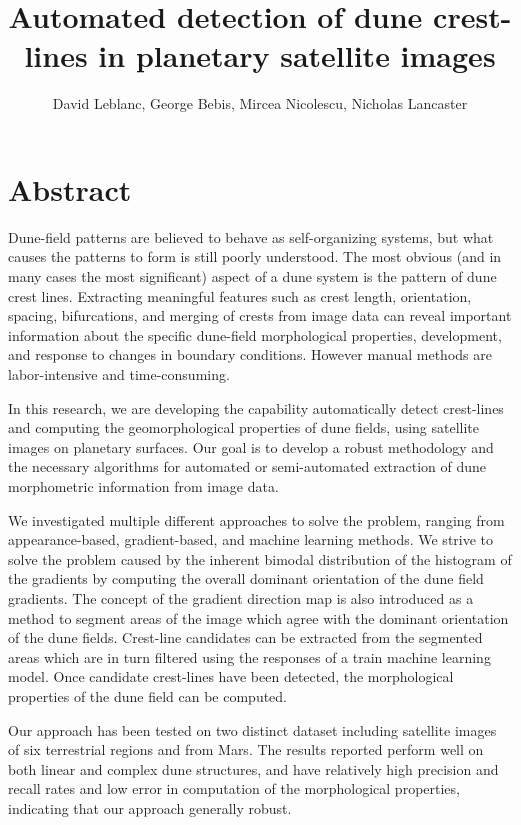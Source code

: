 \documentclass[11pt]{article}
\begin{document}
\title{Automated detection of dune crest-lines in planetary satellite images}
\author{David Leblanc, George Bebis, Mircea Nicolescu, Nicholas Lancaster}

\section*{Abstract}

Dune-field patterns are believed to behave as self-organizing systems, but what causes the patterns to form is still poorly understood. The most obvious (and in many cases the most significant) aspect of a dune system is the pattern of dune crest lines. Extracting meaningful features such as crest length, orientation, spacing, bifurcations, and merging of crests from image data can reveal important information about the specific dune-field morphological properties, development, and response to changes in boundary conditions. However manual methods are labor-intensive and time-consuming. 

In this research, we are developing the capability automatically detect crest-lines and computing the geomorphological properties of dune fields, using satellite images on planetary surfaces. Our goal is to develop a robust methodology and the necessary algorithms for automated or semi-automated extraction of dune morphometric information from image data.

We investigated multiple different approaches to solve the problem, ranging from appearance-based, gradient-based, and machine learning methods. We strive to solve the problem caused by the inherent bimodal distribution of the histogram of the gradients by computing the overall dominant orientation of the dune field gradients. The concept of the gradient direction map is also introduced as a method to segment areas of the image which agree with the dominant orientation of the dune fields. Crest-line candidates can be extracted from the segmented areas which are in turn filtered using the responses of a train machine learning model. Once candidate crest-lines have been detected, the morphological properties of the dune field can be computed.

Our approach has been tested on two distinct dataset including satellite images of six terrestrial regions and from Mars. The results reported perform well on both linear and complex dune structures, and have relatively high precision and recall rates and low error in computation of the morphological properties, indicating that our approach generally robust.








{}

	
\end{document}
